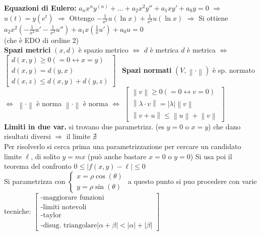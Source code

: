 \documentclass[a4paper, oneside]{article}
\newcommand{\tab}{\hspace*{2em}}
\begin{document}
\textbf{Equazioni di Eulero: } $a_nx^ny^{(n)}+ \dots +a_2x^2y''+a_1xy'+a_0y=0$ $\Rightarrow$ $u(t)=y\left(e^t\right)$ $\Rightarrow$ Ottengo $-\frac{1}{x^2}u\left(\ln{x}\right)+\frac{1}{x^2}u\left(\ln{x}\right)$ $\Rightarrow$ Si ottiene $a_2x^2\left(-\frac{1}{x^2}u'-\frac{1}{x^2}u''\right)+a_1x\left(\frac{1}{x}u'\right)+a_0u=0$ \\(che è EDO di ordine 2)\\
\textbf{Spazi metrici} $(x,d)$ è spazio metrico $\Leftrightarrow$ $d $ è metrica \tab $d$ è metrica $\Leftrightarrow$ $\begin{bmatrix} d(x,y) \geq 0 (=0 \leftrightarrow x = y) \\ d(x,y) = d(y,x) \\ d(x,z) \leq d(x,y) + d(y,z) \end{bmatrix}$ \ \textbf{Spazi normati} $(V, \left\lVert \cdot \right\rVert)$ è sp. normato $\Leftrightarrow$ $\left\lVert \cdot \right\rVert$ è norma  \tab $\left\lVert \cdot \right\rVert$ è norma $\Leftrightarrow$ $\begin{bmatrix} \left\lVert v \right\rVert \geq 0 (= 0  \leftrightarrow v = 0) \\ \left\lVert \lambda \cdot v \right\rVert = \left\lvert \lambda \right\rvert \left\lVert v \right\rVert \\ \left\lVert v + u \right\rVert \leq \left\lVert u \right\rVert + \left\lVert v \right\rVert \end{bmatrix}$\\
\textbf{Limiti in due var.}  si trovano due parametrizz. (es $y=0$ o $x=y$) che dano risultati diversi $\Rightarrow$ il limite $\nexists$ \tab \\ 
Per risolverlo si cerca prima una parametrizzazione per cercare un candidato limite $\ell$, di solito $y=mx$ (può anche bastare $x=0$ o $y=0$) \tab Si usa poi il teorema del confronto $0 \leq | f(x,y) - \ell| \leq 0$\\
Si parametrizza con $\begin{cases} x = \rho \cos(\theta)\\ y = \rho \sin(\theta) \end{cases}$ a questo punto si puo procedere con varie tecniche: $\begin{bmatrix}
    \text{-maggiorare funzioni}\\
    \text{-limiti notevoli}\\
    \text{-taylor}\\
    \text{-disug. triangolare} |\alpha+\beta| < |\alpha| + |\beta|
\end{bmatrix}$\\
\end{document}
